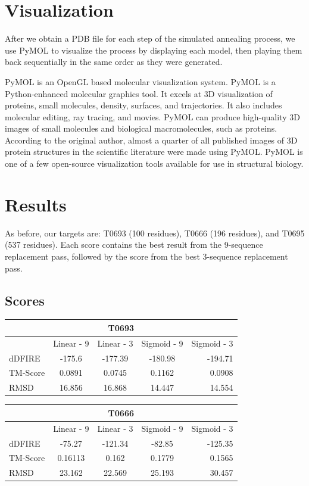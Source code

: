 \documentclass{article}
\begin{document}
\begin{enumerate}
\section{Visualization}

After we obtain a PDB file for each step of the simulated annealing process, we use PyMOL to visualize the process by displaying each model, then playing them back sequentially in the same order as they were generated.

PyMOL is an OpenGL based molecular visualization system. PyMOL is a Python-enhanced molecular graphics tool. It excels at 3D visualization of proteins, small molecules, density, surfaces, and trajectories. It also includes molecular editing, ray tracing, and movies.  PyMOL can produce high-quality 3D images of small molecules and biological macromolecules, such as proteins. According to the original author, almost a quarter of all published images of 3D protein structures in the scientific literature were made using PyMOL. PyMOL is one of a few open-source visualization tools available for use in structural biology.


\section{Results}

As before, our targets are: T0693 (100 residues), T0666 (196 residues), and T0695 (537 residues).  Each score contains the best result from the 9-sequence replacement pass, followed by the score from the best 3-sequence replacement pass.

\subsection{Scores}
\begin{center}
\begin{tabular}{|l|c|c|c|r|}
\multicolumn{5}{c}{T0693} \\
    \hline
      & Linear - 9 & Linear - 3 & Sigmoid - 9 & Sigmoid - 3\\ \hline
    dDFIRE & -175.6 & -177.39 & -180.98 & -194.71 \\ \hline
    TM-Score & 0.0891 & 0.0745 & 0.1162 & 0.0908 \\ \hline
    RMSD & 16.856 & 16.868 & 14.447 & 14.554 \\
    \hline
    \end{tabular}
\end{center}

\begin{center}
\begin{tabular}{|l|c|c|c|r|}
\multicolumn{5}{c}{T0666} \\
    \hline
      & Linear - 9 & Linear - 3 & Sigmoid - 9 & Sigmoid - 3\\ \hline
    dDFIRE & -75.27 & -121.34 & -82.85 & -125.35 \\ \hline
    TM-Score & 0.16113 & 0.162 & 0.1779 & 0.1565 \\ \hline
    RMSD & 23.162 & 22.569 & 25.193 & 30.457 \\
    \hline
    \end{tabular}
\end{center}


\end{enumerate}
\end{document}
